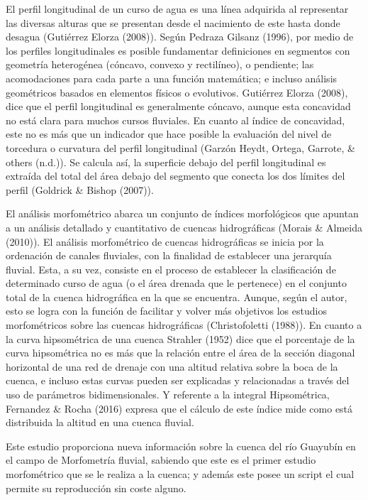 \documentclass[11pt,]{article}
\begin{document}
El perfil longitudinal de un curso de agua es una línea adquirida al
representar las diversas alturas que se presentan desde el nacimiento de
este hasta donde desagua (Gutiérrez Elorza (2008)). Según Pedraza
Gilsanz (1996), por medio de los perfiles longitudinales es posible
fundamentar definiciones en segmentos con geometría heterogénea
(cóncavo, convexo y rectilíneo), o pendiente; las acomodaciones para
cada parte a una función matemática; e incluso análisis geométricos
basados en elementos físicos o evolutivos. Gutiérrez Elorza (2008), dice
que el perfil longitudinal es generalmente cóncavo, aunque esta
concavidad no está clara para muchos cursos fluviales. En cuanto al
índice de concavidad, este no es más que un indicador que hace posible
la evaluación del nivel de torcedura o curvatura del perfil longitudinal
(Garzón Heydt, Ortega, Garrote, \& others (n.d.)). Se calcula así, la
superficie debajo del perfil longitudinal es extraída del total del área
debajo del segmento que conecta los dos límites del perfil (Goldrick \&
Bishop (2007)).

El análisis morfométrico abarca un conjunto de índices morfológicos que
apuntan a un análisis detallado y cuantitativo de cuencas hidrográficas
(Morais \& Almeida (2010)). El análisis morfométrico de cuencas
hidrográficas se inicia por la ordenación de canales fluviales, con la
finalidad de establecer una jerarquía fluvial. Esta, a su vez, consiste
en el proceso de establecer la clasificación de determinado curso de
agua (o el área drenada que le pertenece) en el conjunto total de la
cuenca hidrográfica en la que se encuentra. Aunque, según el autor, esto
se logra con la función de facilitar y volver más objetivos los estudios
morfométricos sobre las cuencas hidrográficas (Christofoletti (1988)).
En cuanto a la curva hipsométrica de una cuenca Strahler (1952) dice que
el porcentaje de la curva hipsométrica no es más que la relación entre
el área de la sección diagonal horizontal de una red de drenaje con una
altitud relativa sobre la boca de la cuenca, e incluso estas curvas
pueden ser explicadas y relacionadas a través del uso de parámetros
bidimensionales. Y referente a la integral Hipsométrica, Fernandez \&
Rocha (2016) expresa que el cálculo de este índice mide como está
distribuida la altitud en una cuenca fluvial.

Este estudio proporciona nueva información sobre la cuenca del río
Guayubín en el campo de Morfometría fluvial, sabiendo que este es el
primer estudio morfométrico que se le realiza a la cuenca; y además este
posee un script el cual permite su reproducción sin coste alguno.
\end{document}
